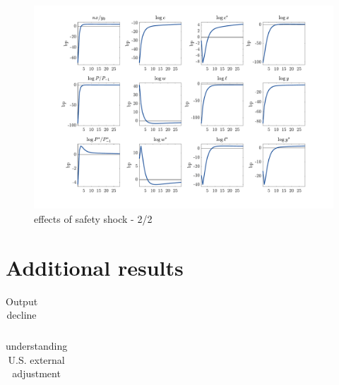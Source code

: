 \documentclass[12pt]{article}
\begin{document}
\begin{figure}[H]
\centering
\hspace*{-4cm}\includegraphics[width=1.5\textwidth,clip=true,trim=0 0 0 0]{../output/figures/fig_20}
\renewcommand\thefigure{19}
\caption{effects of safety shock - 2/2}
\end{figure}

\section{Additional results}

\begin{table}[H]
\centering
\bgroup
\def\arraystretch{1.25}
\begin{tabular}{l|cc} \hline

\end{tabular}
\egroup
\renewcommand\thetable{A1}
\caption{Output decline}
\end{table}

\begin{table}[H]
\centering
\bgroup
\def\arraystretch{1.25}
\begin{tabular}{l|ccc} \hline

\end{tabular}
\egroup
\renewcommand\thetable{7}
\caption{understanding U.S. external adjustment}
\end{table}
\end{document}
